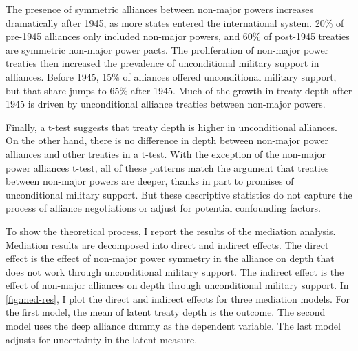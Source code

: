 \documentclass[12pt]{article}
\begin{document}
The presence of symmetric alliances between non-major powers increases dramatically after 1945, as more states entered the international system. 
20\% of pre-1945 alliances only included non-major powers, and 60\% of post-1945 treaties are symmetric non-major power pacts. 
The proliferation of non-major power treaties then increased the prevalence of unconditional military support in alliances. 
Before 1945, 15\% of alliances offered unconditional military support, but that share jumps to 65\% after 1945. 
Much of the growth in treaty depth after 1945 is driven by unconditional alliance treaties between non-major powers. 


Finally, a t-test suggests that treaty depth is higher in unconditional alliances. 
On the other hand, there is no difference in depth between non-major power alliances and other treaties in a t-test. 
With the exception of the non-major power alliances t-test, all of these patterns match the argument that treaties between non-major powers are deeper, thanks in part to promises of unconditional military support. 
But these descriptive statistics do not capture the process of alliance negotiations or adjust for potential confounding factors. 


To show the theoretical process, I report the results of the mediation analysis. 
Mediation results are decomposed into direct and indirect effects. 
The direct effect is the effect of non-major power symmetry in the alliance on depth that does not work through unconditional military support. 
The indirect effect is the effect of non-major alliances on depth through unconditional military support. 
In \autoref{fig:med-res}, I plot the direct and indirect effects for three mediation models. 
For the first model, the mean of latent treaty depth is the outcome. 
The second model uses the deep alliance dummy as the dependent variable. 
The last model adjusts for uncertainty in the latent measure. 
\end{document}
